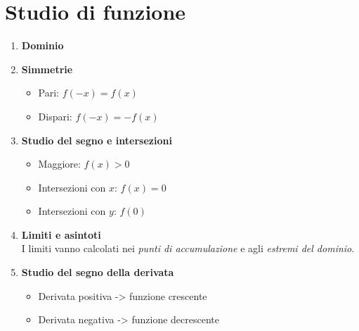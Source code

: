 \section{Studio di funzione}

\begin{enumerate}
    \item \textbf{Dominio}
    \item \textbf{Simmetrie}
          \begin{itemize}
            \item Pari: $f(-x) = f(x)$
            \item Dispari: $f(-x) = -f(x)$
          \end{itemize}
    \item \textbf{Studio del segno e intersezioni}
          \begin{itemize}
            \item Maggiore: $f(x) > 0$
            \item Intersezioni con $x$: $f(x) = 0$
            \item Intersezioni con $y$: $f(0)$
          \end{itemize}
    \item \textbf{Limiti e asintoti}\\
          I limiti vanno calcolati nei \textit{punti di accumulazione} e agli \textit{estremi del dominio}.
    \item \textbf{Studio del segno della derivata}
          \begin{itemize}
            \item Derivata positiva -> funzione crescente
            \item Derivata negativa -> funzione decrescente
          \end{itemize}
\end{enumerate}

